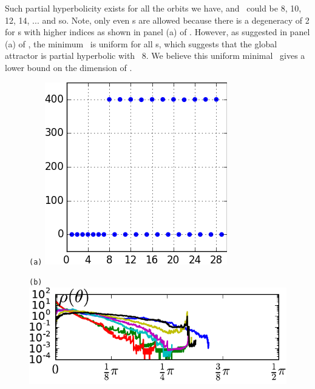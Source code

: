 \documentclass[prl,aps,preprint,showpacs]{revtex4-1} %
\begin{document}
Such partial hyperbolicity exists for all the orbits we have, and
\tph\ could be 8, 10, 12, 14, ... and so. Note, only even \tph s
are allowed because there is a degeneracy of 2 for \Fe s with
higher indices as shown in panel (a) of .
However,  as suggested in panel (a) of
, the minimum \tph\
is uniform for all \po s, which suggests that the global attractor
is partial hyperbolic with \tph\ 8. We believe this uniform
minimal \tph\ gives a lower bound on the dimension of \inm.
\begin{figure}[h]
  \centering
  \begin{minipage}{.18\textwidth}
    \centering \small{\texttt{(a)}}
    \includegraphics[width=\textwidth]{partialHyperb1}
  \end{minipage}
  \begin{minipage}{.28\textwidth}
    \begin{minipage}{\textwidth}
      \centering \small{\texttt{(b)}}
      \includegraphics[width=\textwidth]{tangency1}

\end{minipage}
\end{minipage}
\end{figure}
\end{document}
